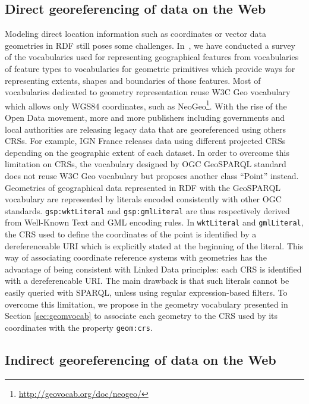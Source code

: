 \subsection{Direct georeferencing of data on the Web}
\label{sec:directgeo}
Modeling direct location information such as coordinates or vector data geometries in RDF still poses some challenges. In~\cite{Atemezing:TC12}, we have conducted a survey of the vocabularies used for representing geographical features from vocabularies of feature types to vocabularies for geometric primitives which provide ways for representing extents, shapes and boundaries of those features. 
Most of vocabularies dedicated to geometry representation reuse W3C Geo vocabulary which allows only WGS84 coordinates, such as NeoGeo\footnote{\url{http://geovocab.org/doc/neogeo/}}. With the rise of the Open Data movement, more and more publishers including governments and local authorities are releasing legacy data that are georeferenced using others CRSs. For example, IGN France releases data using different projected CRSs depending on the geographic extent of each dataset. In order to overcome this limitation on CRSs, the vocabulary designed by OGC GeoSPARQL standard  does not reuse W3C Geo vocabulary but proposes another class ``Point'' instead. Geometries of geographical data represented in RDF with the GeoSPARQL vocabulary are represented by literals encoded consistently with other OGC standards. \texttt{gsp:wktLiteral} and \texttt{gsp:gmlLiteral} are thus respectively derived from Well-Known Text and GML encoding rules. In \texttt{wktLiteral} and \texttt{gmlLiteral}, the CRS used to define the coordinates of the point is identified by a dereferenceable URI which is explicitly stated at the beginning of the literal. This way of associating coordinate reference systems with geometries has the advantage of being consistent with Linked Data principles: each CRS is identified with a dereferencable URI. The main drawback is that such literals cannot be easily queried with SPARQL, unless using regular expression-based filters.  To overcome this limitation, we propose in the geometry vocabulary presented in Section \ref{sec:geomvocab} to associate each geometry to the CRS used by its coordinates with the property \texttt{geom:crs}.

\subsection{Indirect georeferencing of data on the Web}
\label{sec:indirectgeo}

